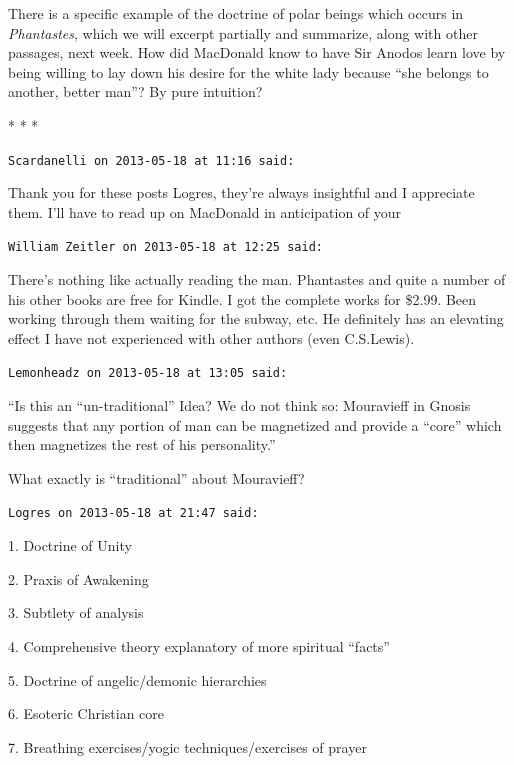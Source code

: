 There is a specific example of the doctrine of polar beings which occurs in \emph{Phantastes}, which we will excerpt partially and summarize, along with other passages, next week. How did MacDonald know to have Sir Anodos learn love by being willing to lay down his desire for the white lady because ``she belongs to another, better man''? By pure intuition?



\begin{center}* * *\end{center}

\begin{footnotesize}
\begin{sffamily}
\texttt{Scardanelli on 2013-05-18 at 11:16 said:}

Thank you for these posts Logres, they're always insightful and I appreciate them. I'll have to read up on MacDonald in anticipation of your

\hfill

\texttt{William Zeitler on 2013-05-18 at 12:25 said:}

There's nothing like actually reading the man. Phantastes and quite a number of his other books are free for Kindle. I got the complete works for \$2.99. Been working through them waiting for the subway, etc. He definitely has an elevating effect I have not experienced with other authors (even C.S.Lewis).

\hfill

\texttt{Lemonheadz on 2013-05-18 at 13:05 said:}

``Is this an ``un-traditional'' Idea? We do not think so: Mouravieff in Gnosis suggests that any portion of man can be magnetized and provide a ``core'' which then magnetizes the rest of his personality.''

What exactly is ``traditional'' about Mouravieff?

\hfill

\texttt{Logres on 2013-05-18 at 21:47 said:}

1. Doctrine of Unity

2. Praxis of Awakening

3. Subtlety of analysis

4. Comprehensive theory explanatory of more spiritual ``facts''

5. Doctrine of angelic/demonic hierarchies

6. Esoteric Christian core

7. Breathing exercises/yogic techniques/exercises of prayer


\end{sffamily}
\end{footnotesize}
